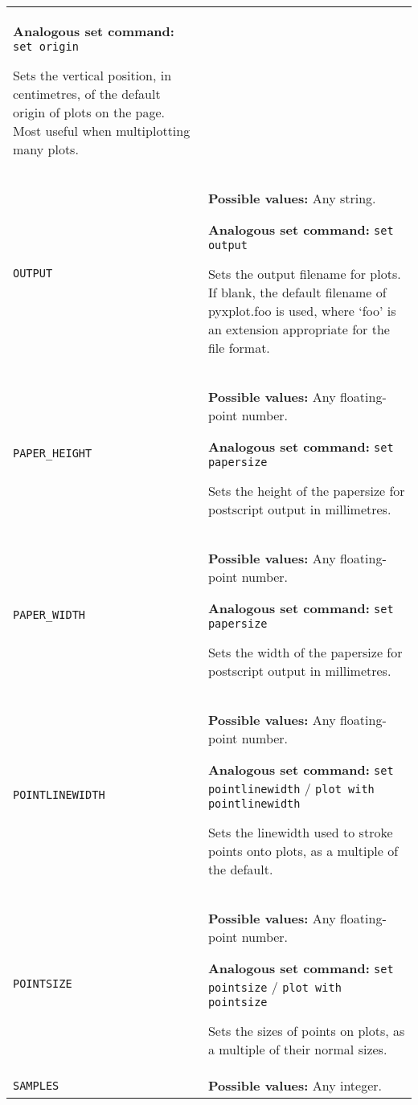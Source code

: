 \documentclass[a4paper,onecolumn,11pt]{book}
\begin{document}
\begin{longtable}{p{3.4cm}p{9cm}}
                   \textbf{Analogous set command:} \texttt{set origin}\index{set origin command@\texttt{set origin} command}

                   Sets the vertical position, in centimetres, of the default origin of plots on the page. Most useful when multiplotting many plots.
                   \\
\texttt{OUTPUT} & \textbf{Possible values:} Any string.

                   \textbf{Analogous set command:} \texttt{set output}\index{set output command@\texttt{set output} command}

                   Sets the output filename for plots. If blank, the default filename of pyxplot.foo is used, where `foo' is an extension appropriate for the file format.
                   \\
\texttt{PAPER\_HEIGHT} & \textbf{Possible values:} Any floating-point number.

                   \textbf{Analogous set command:} \texttt{set papersize}\index{set papersize command@\texttt{set papersize} command}

                   Sets the height of the papersize for postscript output in millimetres.
                   \\
\texttt{PAPER\_WIDTH} & \textbf{Possible values:} Any floating-point number.

                   \textbf{Analogous set command:} \texttt{set papersize}\index{set papersize command@\texttt{set papersize} command}

                   Sets the width of the papersize for postscript output in millimetres.
                   \\
\texttt{POINTLINEWIDTH} & \textbf{Possible values:} Any floating-point number.

                   \textbf{Analogous set command:} \texttt{set pointlinewidth} / \texttt{plot with pointlinewidth}\index{set pointlinewidth command@\texttt{set pointlinewidth} command}

                   Sets the linewidth used to stroke points onto plots, as a multiple of the default.
                   \\
\texttt{POINTSIZE} & \textbf{Possible values:} Any floating-point number.

                   \textbf{Analogous set command:} \texttt{set pointsize} / \texttt{plot with pointsize}\index{set pointsize command@\texttt{set pointsize} command}

                   Sets the sizes of points on plots, as a multiple of their normal sizes.
                   \\
\texttt{SAMPLES} & \textbf{Possible values:} Any integer.


\end{longtable}
\end{document}
